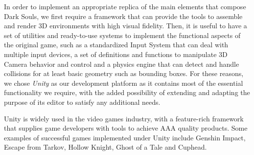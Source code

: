 \documentclass[cic,tc,english]{iiufrgs}
\begin{document}
In order to implement an appropriate replica of the main elements that compose Dark Souls, we first require a framework that can provide the tools to assemble and render 3D environments with high visual fidelity. Then, it is useful to have a set of utilities and ready-to-use systems to implement the functional aspects of the original game, such as a standardized Input System that can deal with multiple input devices, a set of definitions and functions to manipulate 3D Camera behavior and control and a physics engine that can detect and handle collisions for at least basic geometry such as bounding boxes. For these reasons, we chose \emph{Unity} as our development platform as it contains most of the essential functionality we require, with the added possibility of extending and adapting the purpose of its editor to satisfy any additional needs.


Unity is widely used in the video games industry, with a feature-rich framework that supplies game developers with tools to achieve AAA quality products. Some examples of successful games implemented under Unity include Genshin Impact, Escape from Tarkov, Hollow Knight, Ghost of a Tale and Cuphead.
\end{document}
